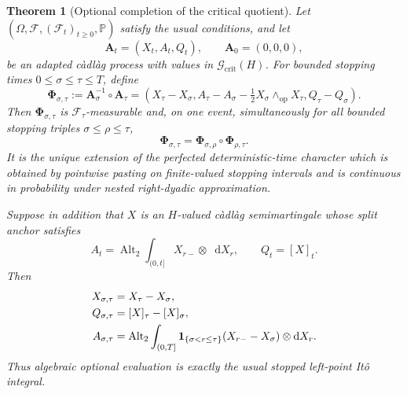 \documentclass[10pt,reqno]{amsart}
\theoremstyle{plain}
\newtheorem{theorem}{Theorem}[section]
\theoremstyle{definition}
\theoremstyle{remark}
\begin{document}
\begin{theorem}[Optional completion of the critical quotient]
\label{cc:thm-critical-optional-quotient}
Let \((\Omega,\mathcal F,(\mathcal F_t)_{t\geq0},\mathbb P)\) satisfy the
usual conditions, and let
\[
 \mathbf A_t=(X_t,A_t,Q_t),\qquad \mathbf A_0=(0,0,0),
\]
be an adapted c\`adl\`ag process with values in
\(\mathscr G_{\mathrm{crit}}(H)\).  For bounded stopping times
\(0\leq\sigma\leq\tau\leq T\), define
\begin{equation}
 \mathbf\Phi_{\sigma,\tau}
 :=\mathbf A_\sigma^{-1}\circ\mathbf A_\tau
 =\left(
 X_\tau-X_\sigma,
 A_\tau-A_\sigma-\tfrac12X_\sigma\wedge_{\mathrm{op}}X_\tau,
 Q_\tau-Q_\sigma
 \right).
 \label{cc:eq-critical-stopped-anchor}
\end{equation}
Then \(\mathbf\Phi_{\sigma,\tau}\) is
\(\mathcal F_\tau\)-measurable and, on one event, simultaneously for all
bounded stopping triples \(\sigma\leq\rho\leq\tau\),
\begin{equation}
 \mathbf\Phi_{\sigma,\tau}
 =\mathbf\Phi_{\sigma,\rho}\circ\mathbf\Phi_{\rho,\tau}.
 \label{cc:eq-critical-stopped-Chen}
\end{equation}
It is the unique extension of the perfected deterministic-time character
which is obtained by pointwise pasting on finite-valued stopping intervals
and is continuous in probability under nested right-dyadic approximation.

Suppose in addition that \(X\) is an \(H\)-valued c\`adl\`ag
semimartingale whose split anchor satisfies
\[
 A_t=\operatorname{Alt}_2\int_{(0,t]}X_{r-}\otimes
       \mathop{}\!\mathrm dX_r,
 \qquad
 Q_t=[X]_t.
\]
Then
\begin{align}
 X_{\sigma,\tau}&=X_\tau-X_\sigma,\notag\\
 Q_{\sigma,\tau}&=[X]_\tau-[X]_\sigma,\notag\\
 A_{\sigma,\tau}
 &=\operatorname{Alt}_2\int_{(0,T]}
  {\mathbf 1}_{\{\sigma<r\leq\tau\}}
  (X_{r-}-X_\sigma)\otimes\mathop{}\!\mathrm dX_r.
 \label{cc:eq-critical-stopped-integral}
\end{align}
Thus algebraic optional evaluation is exactly the usual stopped left-point
It\^o integral.
\end{theorem}
\end{document}
